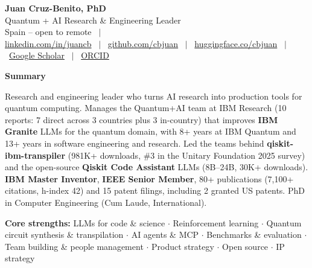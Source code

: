 \documentclass[a4paper,10pt]{article}
\newcommand{\cvsection}[1]{%
  \vspace{2.5mm}%
  \begin{tcolorbox}{\headfont\bfseries\large\color{accent} #1}\end{tcolorbox}%
  \vspace{-1.5mm}%
}
\begin{document}
\begin{center}
  {\headfont\Huge\bfseries\color{accent}Juan Cruz-Benito, PhD}\\[1.8mm]
  {\headfont\large Quantum + AI Research \& Engineering Leader}\\[1.6mm]
  \small
  Spain -- open to remote \ $\vert$ \
  \sitelink\\[0.6mm]
  \href{https://www.linkedin.com/in/juancb/}{linkedin.com/in/juancb} \ $\vert$ \
  \href{https://github.com/cbjuan}{github.com/cbjuan} \ $\vert$ \
  \href{https://huggingface.co/cbjuan}{huggingface.co/cbjuan} \ $\vert$ \
  \href{https://scholar.google.es/citations?user=_mLnQPgAAAAJ}{Google Scholar} \ $\vert$ \
  \href{https://orcid.org/0000-0003-2045-8329}{ORCID}
\end{center}
\vspace{-2mm}

\cvsection{Summary}
\begin{justify}\small
Research and engineering leader who turns AI research into production tools for quantum computing. Manages the Quantum+AI team at IBM Research (10 reports: 7 direct across 3 countries plus 3 in-country) that improves \textbf{IBM Granite} LLMs for the quantum domain, with 8+ years at IBM Quantum and 13+ years in software engineering and research. Led the teams behind \textbf{qiskit-ibm-transpiler} (981K+ downloads, \#3 in the Unitary Foundation 2025 survey) and the open-source \textbf{Qiskit Code Assistant} LLMs (8B--24B, 30K+ downloads). \textbf{IBM Master Inventor}, \textbf{IEEE Senior Member}, 80+ publications (7,100+ citations, h-index 42) and 15 patent filings, including 2 granted US patents. PhD in Computer Engineering (Cum Laude, International).
\end{justify}

\vspace{1mm}
{\small
\textbf{Core strengths:} LLMs for code \& science $\cdot$ Reinforcement learning $\cdot$ Quantum circuit synthesis \& transpilation $\cdot$ AI agents \& MCP $\cdot$ Benchmarks \& evaluation $\cdot$ Team building \& people management $\cdot$ Product strategy $\cdot$ Open source $\cdot$ IP strategy
}
\end{document}
